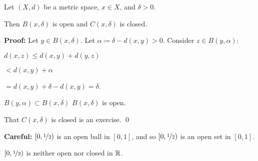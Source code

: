 \documentclass[10pt,aspectratio=169]{beamer}
\begin{document}
\begin{frame}

\begin{proposition}
Let $(X,d)$ be a metric space, $x \in X$, and $\delta > 0$.

\pause
Then
$B(x,\delta)$ is open and 
$C(x,\delta)$ is closed.
\end{proposition}

\pause
\textbf{Proof:}
Let $y \in B(x,\delta)$.
\pause
Let $\alpha \coloneqq \delta-d(x,y) > 0$.
\pause
Consider $z \in B(y,\alpha)$:

\pause
\medskip

$
d(x,z) \leq d(x,y) + d(y,z)
$

\pause
\medskip
\quad
$ < d(x,y) + \alpha$

\pause
\medskip
\quad
$= d(x,y) + \delta-d(x,y) = \delta$.

\pause
\vspace*{-0.7in}
\hspace*{2.9in}

\vspace*{-0.3in}

\pause
\thus \quad
$B(y,\alpha) \subset B(x,\delta)$ \wthus
$B(x,\delta)$ is open.


\pause
\medskip

That $C(x,\delta)$ is closed is an exercise.
\qed

\pause
\medskip

\textbf{Careful:}
$[0,\nicefrac{1}{2})$ is
an open ball in $[0,1]$, and so $[0,\nicefrac{1}{2})$ is
an open set in $[0,1]$.

\pause
$[0,\nicefrac{1}{2})$ is neither open nor closed in ${\mathbb{R}}$.

\end{frame}
\end{document}
